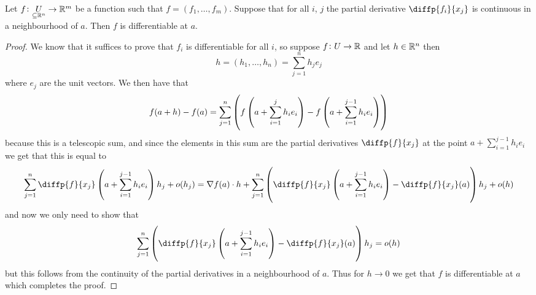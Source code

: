 \documentclass[11pt,a4paper]{article}
\begin{document}
\begin{proposition}
  Let $f \colon \underset{\subseteq \mathbb{R}^n}{U} \to \mathbb{R}^m$ be a function
  such that $f = (f_1,\dots,f_m)$.
  Suppose that for all $i$, $j$ the partial derivative $\diffp{{f_i}}{{x_j}}$
  is continuous in a neighbourhood of $a$.
  Then $f$ is differentiable at $a$.
\end{proposition}
\begin{proof}
  We know that it suffices to prove that $f_i$ is differentiable for
  all $i$, so suppose $f \colon U \to \mathbb{R}$ and let $h \in \mathbb{R}^n$ then
  \[
    h = (h_1,\dots,h_n) = \sum_{j=1}^{n} h_j e_j
  \]
  where $e_j$ are the unit vectors.
  We then have that
  \[
    f(a + h) - f(a) =
    \sum_{j=1}^{n}
    \del
    {
      f\del{a + \sum_{i=1}^{j} h_i e_i} -
      f\del{a + \sum_{i=1}^{j - 1} h_i e_i}
    }
  \]
  because this is a telescopic sum, and since the elements in this sum
  are the partial derivatives $\diffp{f}{{x_j}}$ at the point
  $a + \sum_{i=1}^{j - 1} h_i e_i$ we get that this is equal to
  \[
    \sum_{j=1}^{n} \diffp{f}{{x_j}} \del{a + \sum_{i=1}^{j - 1} h_i e_i} h_j
    + o(h_j) =
    \nabla f(a) \cdot h +
    \sum_{j=1}^{n} \del{\diffp{f}{{x_j}} 
    \del{a + \sum_{i=1}^{j - 1} h_i e_i} - \diffp{f}{{x_j}}(a)} h_j
    + o(h)
  \]
  and now we only need to show that
  \[
    \sum_{j=1}^{n} \del{\diffp{f}{{x_j}} 
    \del{a + \sum_{i=1}^{j - 1} h_i e_i} - \diffp{f}{{x_j}}(a)} h_j
    = o(h)
  \]
  but this follows from the continuity of the partial derivatives in a
  neighbourhood of $a$.
  Thus for $h \to 0$ we get that $f$ is differentiable at $a$ which completes
  the proof.
\end{proof}
\end{document}
